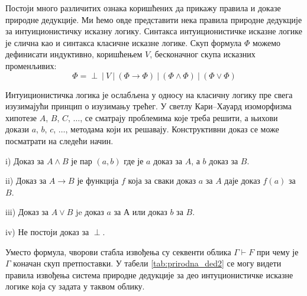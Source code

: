 Постоји много различитих ознака коришћених да прикажу правила и доказе
природне дедукције. Ми ћемо овде представити нека правила природне
дедукције за интуиционистичку исказну логику. Синтакса
интуиционистичке исказне логике је слична као и синтакса класичне
исказне логике. Скуп формула $\Phi$ можемо дефинисати индуктивно,
коришћењем $V$, бесконачног скупа исказних променљивих:
$$\Phi = \perp\ |\ V\ |\ (\Phi \rightarrow \Phi)\ |\ (\Phi \land \Phi)\ |\ (\Phi \lor \Phi)$$


Интуиционистичка логика \cite{kripke1965semantical,
  palmgren2009semantics} је ослабљена у односу на класичну логику пре
свега изузимајући принцип о изузимању трећег. У светлу Кари--Хауард 
изоморфизма хипотезе $A$, $B$,
$C$, $\ldots$, се сматрају проблемима које треба решити, а њихови
докази $a$, $b$, $c$, $\ldots$, методама који их
решавају. Конструктивни доказ се може посматрати на следећи начин.
\begin{description}
\item{i)} Доказ за $A \land B$ је пар $(a, b)$ где је $a$ доказ за
  $A$, а $b$ доказ за $B$.
\item{ii)} Доказ за $A \to B$ је функција $f$ која за сваки доказ $a$
  за $A$ даје доказ $f(a)$ за $B$.
\item{iii)} Доказ за $A \lor B$ je доказ $a$ за $А$ или доказ $b$ за
  $B$.
\item{iv)} Не постоји доказ за $\perp$.
\end{description}


Уместо формула, чворови стабла извођења су секвенти облика $\Gamma
\vdash F$ при чему је $\Gamma$ коначан скуп претпоставки.  У табели
\ref{tab:prirodna_ded2} се могу видети правила извођења система
природне дедукције за део интуционистичке исказне логике која су
задата у таквом облику.

